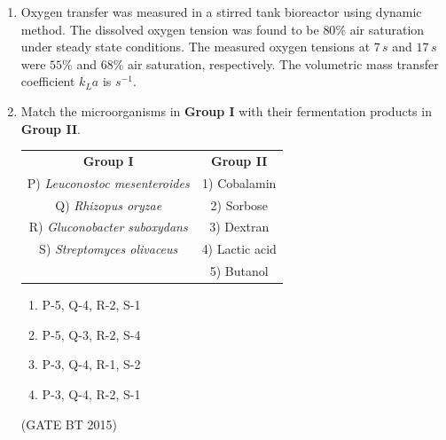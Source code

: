 \documentclass[journal,12pt,onecolumn]{IEEEtran}
\begin{document}
\begin{enumerate}[label=\textbf{Q.\arabic*}]
\begin{multicols}{2}
\begin{enumerate}
    \item P-4, Q-2, R-3, S-5
    \item P-4, Q-2, R-3, S-6
    \item P-3, Q-1, R-2, S-5
    \item P-3, Q-1, R-2, S-6
\end{enumerate}
\end{multicols}\hfill (GATE BT 2015)

\item Oxygen transfer was measured in a stirred tank bioreactor using dynamic method. The dissolved oxygen tension was found to be $80\%$ air saturation under steady state conditions. The measured oxygen tensions at $7 \, s$ and $17 \, s$ were $55\%$ and $68\%$ air saturation, respectively. The volumetric mass transfer coefficient $k_{L}a$ is \underline{\hspace{2cm}} $s^{-1}$.

\item Match the microorganisms in \textbf{Group I} with their fermentation products in \textbf{Group II}.  

\begin{table}[H]
\begin{tabular}{cc}
\textbf{Group I} & \textbf{Group II} \\
P) \textit{Leuconostoc mesenteroides}   & 1) Cobalamin \\
Q) \textit{Rhizopus oryzae}             & 2) Sorbose \\
R) \textit{Gluconobacter suboxydans}    & 3) Dextran \\
S) \textit{Streptomyces olivaceus}      & 4) Lactic acid \\
                                        & 5) Butanol \\
\end{tabular}
\end{table}

\begin{multicols}{2}
\begin{enumerate}
    \item P-5, Q-4, R-2, S-1
    \item P-5, Q-3, R-2, S-4
    \item P-3, Q-4, R-1, S-2
    \item P-3, Q-4, R-2, S-1
\end{enumerate}
\end{multicols}\hfill (GATE BT 2015)


\end{enumerate}
\end{document}

